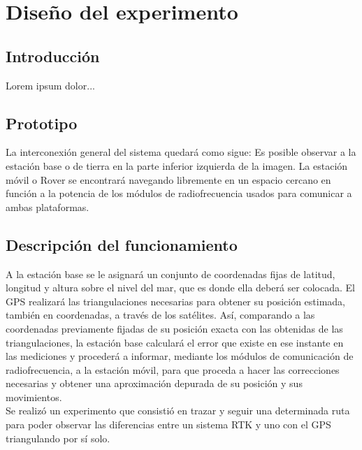 
\chapter{Diseño del experimento}
\label{Chap:DisExp} %


\section{Introducción}

Lorem ipsum dolor...

\section{Prototipo}

La interconexión general del sistema quedará como sigue: Es posible observar a la estación base o de tierra en la parte inferior izquierda de la imagen. La estación móvil o Rover se encontrará navegando libremente en un espacio cercano en función a la potencia de los módulos de radiofrecuencia usados para comunicar a ambas plataformas.

\section{Descripción del funcionamiento}

A la estación base se le asignará un conjunto de coordenadas fijas de latitud, longitud y altura sobre el nivel del mar, que es donde ella deberá ser colocada. El GPS realizará las triangulaciones necesarias para obtener su posición estimada, también en coordenadas, a través de los satélites. Así, comparando a las coordenadas previamente fijadas de su posición exacta con las obtenidas de las triangulaciones, la estación base calculará el
error que existe en ese instante en las mediciones y procederá a informar, mediante los módulos de comunicación de radiofrecuencia, a la estación móvil, para que proceda a hacer las correcciones necesarias y obtener una aproximación depurada de su posición y sus movimientos. \\

Se realizó un experimento que consistió en trazar y seguir una determinada ruta para poder observar las diferencias entre un sistema RTK y uno con el GPS triangulando por sí solo. \\

